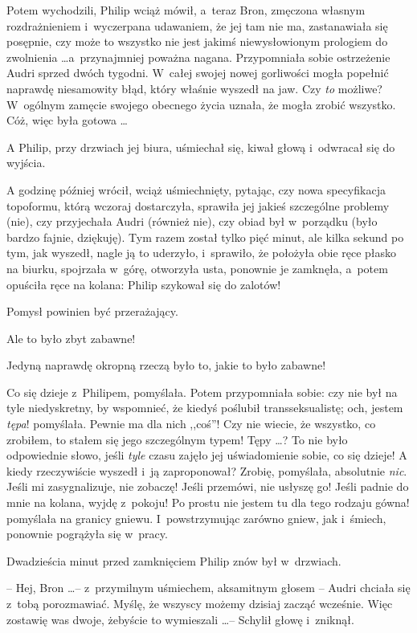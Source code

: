 \documentclass[oneside,polish,11pt,rmheadings]{mwbk}
\begin{document}
Potem wychodzili, Philip wciąż mówił, a~teraz Bron, zmęczona własnym rozdrażnieniem i~wyczerpana udawaniem, że jej tam nie ma, zastanawiała się posępnie, czy może to wszystko nie jest jakimś niewysłowionym prologiem do zwolnienia \ldots  a~przynajmniej poważna nagana. Przypomniała sobie ostrzeżenie Audri sprzed dwóch tygodni. W~całej swojej nowej gorliwości mogła popełnić naprawdę niesamowity błąd, który właśnie wyszedł na jaw. Czy \textit{to }możliwe? W~ogólnym zamęcie swojego obecnego życia uznała, że mogła zrobić wszystko. Cóż, więc była gotowa \ldots  

A Philip, przy drzwiach jej biura, uśmiechał się, kiwał głową i~odwracał się do wyjścia. 

A godzinę później wrócił, wciąż uśmiechnięty, pytając, czy nowa specyfikacja topoformu, którą wczoraj dostarczyła, sprawiła jej jakieś szczególne problemy (nie), czy przyjechała Audri (również nie), czy obiad był w~porządku (było bardzo fajnie, dziękuję). Tym razem został tylko pięć minut, ale kilka sekund po tym, jak wyszedł, nagle ją to uderzyło, i~sprawiło, że położyła obie ręce płasko na biurku, spojrzała w~górę, otworzyła usta, ponownie je zamknęła, a~potem opuściła ręce na kolana: Philip szykował się do zalotów! 

Pomysł powinien być przerażający. 

Ale to było zbyt zabawne! 

Jedyną naprawdę okropną rzeczą było to, jakie to było zabawne! 

Co się dzieje z~Philipem, pomyślała. Potem przypomniała sobie: czy nie był na tyle niedyskretny, by wspomnieć, że kiedyś poślubił transseksualistę; och, jestem \textit{tępa}! pomyślała. Pewnie ma dla nich ,,coś''! Czy nie wiecie, że wszystko, co zrobiłem, to stałem się jego szczególnym typem! Tępy \ldots  ? To nie było odpowiednie słowo, jeśli \textit{tyle }czasu zajęło jej uświadomienie sobie, co się dzieje! A kiedy rzeczywiście wyszedł i~ją zaproponował? Zrobię, pomyślała, absolutnie \textit{nic}. Jeśli mi zasygnalizuje, nie zobaczę! Jeśli przemówi, nie usłyszę go! Jeśli padnie do mnie na kolana, wyjdę z~pokoju! Po prostu nie jestem tu dla tego rodzaju gówna! pomyślała na granicy gniewu. I~powstrzymując zarówno gniew, jak i~śmiech, ponownie pogrążyła się w~pracy. 

Dwadzieścia minut przed zamknięciem Philip znów był w~drzwiach. 

-- Hej, Bron \ldots  -- z~przymilnym uśmiechem, aksamitnym głosem -- Audri chciała się z~tobą porozmawiać. Myślę, że wszyscy możemy dzisiaj zacząć wcześnie. Więc zostawię was dwoje, żebyście to wymieszali \ldots  -- Schylił głowę i~zniknął. 
\end{document}

